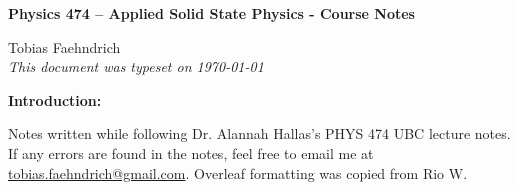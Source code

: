 \documentclass[10pt]{article}
\begin{document}
\begin{tcolorbox}
  \begin{center}
  \begin{Large}
    \textbf{Physics 474 – Applied Solid State Physics - Course Notes} \\
    \vspace{5pt}
  \end{Large}
  \begin{large}
        Tobias Faehndrich \\
\vspace{5pt}
    \emph{This document was typeset on \today}
  \end{large}
  \end{center}
\end{tcolorbox}

\begin{center}
  \textbf{Introduction:}

Notes written while following Dr. Alannah Hallas's PHYS 474 UBC lecture notes. If any errors are found in the notes, feel free to email me at \href{mailto:tobias.faehndrich@gmail.com}{tobias.faehndrich@gmail.com}. Overleaf formatting was copied from Rio W.

\end{center}
\tableofcontents

\newpage


\newpage



\newpage


\newpage


\newpage

\end{document}
